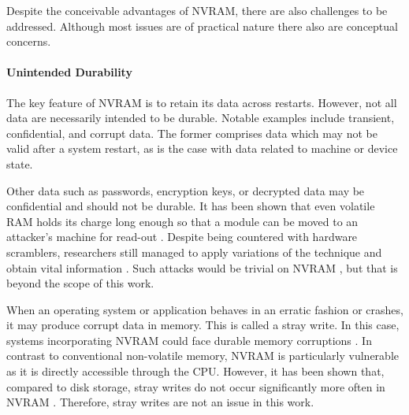 Despite the conceivable advantages of \ac{NVRAM}, there are also challenges to
be addressed. Although most issues are of practical nature there also are
conceptual concerns.

\paragraph{Unintended Durability}

The key feature of \ac{NVRAM} is to retain its data across restarts. However,
not all data are necessarily intended to be durable. Notable examples include
transient, confidential, and corrupt data. The former comprises data which may
not be valid after a system restart, as is the case with data related to machine
or device state.

Other data such as passwords, encryption keys, or decrypted data may be
confidential and should not be durable. It has been shown that even volatile
\ac{RAM} holds its charge long enough so that a module can be moved to an
attacker's machine for read-out \cite{halderman2008lest}. Despite being
countered with hardware scramblers, researchers still managed to apply
variations of the technique and obtain vital information
\cite{yitbarek2017cold}. Such attacks would be trivial on \ac{NVRAM}
\cite{bailey2011operating}, but that is beyond the scope of this work.


When an operating system or application behaves in an erratic fashion or
crashes, it may produce corrupt data in memory. This is called a stray write. In
this case, systems incorporating \ac{NVRAM} could face durable memory
corruptions \cite{condit2009better, venkataraman2011consistent}. In contrast to
conventional non-volatile memory, \ac{NVRAM} is particularly vulnerable as it is
directly accessible through the \ac{CPU}. However, it has been shown that,
compared to disk storage, stray writes do not occur significantly more often in
\ac{NVRAM} \cite{chen1996rio}. Therefore, stray writes are not an issue in this
work.

